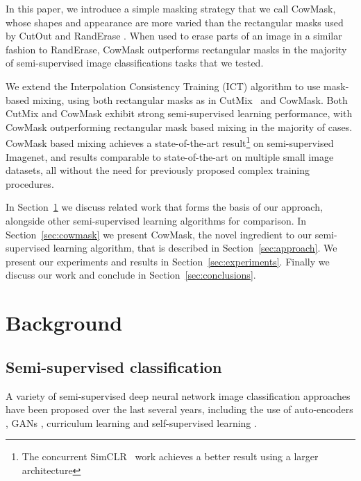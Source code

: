\documentclass{article}
\begin{document}
In this paper, we introduce a simple masking strategy that we call CowMask, whose shapes and appearance
are more varied than the rectangular masks used by CutOut and RandErase \cite{Zhong:RandErase}.
When used to erase parts of an image in a similar fashion to RandErase, CowMask
outperforms rectangular masks in the majority of semi-supervised image classifications tasks that we tested.



We extend the Interpolation Consistency Training (ICT)
algorithm \cite{Verma:ICT} to use mask-based mixing, using both rectangular masks as in CutMix~\cite{Yun:CutMix} and CowMask. Both CutMix and CowMask exhibit strong semi-supervised learning
performance, with CowMask outperforming rectangular mask based mixing in the majority
of cases. CowMask based mixing achieves a state-of-the-art result\footnote{The concurrent SimCLR~\cite{Chen:SimCLR} work achieves a better result using a larger architecture} on semi-supervised Imagenet, and results comparable to state-of-the-art on multiple small image datasets, all without the need for previously proposed complex training procedures.



In Section~\ref{sec:background} we discuss related work that forms the basis of our approach, alongside other semi-supervised learning algorithms for comparison. In Section~\ref{sec:cowmask} we present CowMask, the novel ingredient to our semi-supervised learning algorithm, that is described in Section~\ref{sec:approach}. We present our experiments and results in Section~\ref{sec:experiments}. Finally we discuss our work and conclude in Section~\ref{sec:conclusions}.






\section{Background}
\label{sec:background}



\subsection{Semi-supervised classification}
\label{sec:semisupreview}
A variety of semi-supervised deep neural network image classification approaches have been
proposed over the last several years, including the use of
auto-encoders \cite{Wang:EnAET, Rasmus:LadderNetworks},
GANs \cite{Salimans:ImprovedGANs, Dai:SemiSupBadGAN},
curriculum learning \cite{Cascante:CurriculumSemiSup} and
self-supervised learning \cite{Zhai:S4L}.
\end{document}
